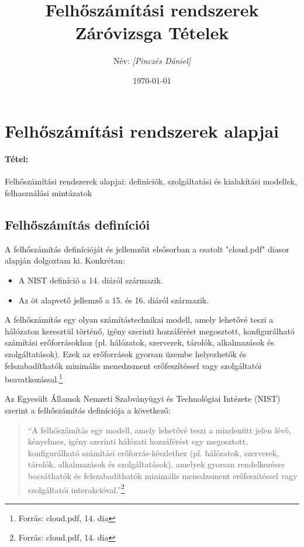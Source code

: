 \documentclass[a4paper,12pt]{article}
\title{\textbf{Felhőszámítási rendszerek Záróvizsga Tételek}}
\author{Név: \textit{[Pinczés Dániel]}}
\date{\today}
\begin{document}
    \maketitle
    \thispagestyle{empty}
    \newpage

    \tableofcontents
    \newpage


    \section{Felhőszámítási rendszerek alapjai}

    \paragraph{Tétel:} Felhőszámítási rendszerek alapjai: definíciók, szolgáltatási és kialakítási modellek, felhasználási mintázatok

    \subsection{Felhőszámítás definíciói}

    A felhőszámítás definícióját és jellemzőit elsősorban a csatolt "cloud.pdf" diasor alapján dolgoztam ki. Konkrétan:

    \begin{itemize}
        \item A NIST definíció a 14. diáról származik.
        \item Az öt alapvető jellemző a 15. és 16. diáról származik.
    \end{itemize}

    A felhőszámítás egy olyan számítástechnikai modell, amely lehetővé teszi a hálózaton keresztül történő, igény szerinti hozzáférést megosztott, konfigurálható számítási erőforrásokhoz (pl. hálózatok, szerverek, tárolók, alkalmazások és szolgáltatások). Ezek az erőforrások gyorsan üzembe helyezhetők és felszabadíthatók minimális menedzsment erőfeszítéssel vagy szolgáltatói beavatkozással.\footnote{Forrás: cloud.pdf, 14. dia}

    Az Egyesült Államok Nemzeti Szabványügyi és Technológiai Intézete (NIST) szerint a felhőszámítás definíciója a következő:

    \begin{quote}
        ``A felhőszámítás egy modell, amely lehetővé teszi a mindenütt jelen lévő, kényelmes, igény szerinti hálózati hozzáférést egy megosztott, konfigurálható számítási erőforrás-készlethez (pl. hálózatok, szerverek, tárolók, alkalmazások és szolgáltatások), amelyek gyorsan rendelkezésre bocsáthatók és felszabadíthatók minimális menedzsment erőfeszítéssel vagy szolgáltatói interakcióval.''\footnote{Forrás: cloud.pdf, 14. dia}
    \end{quote}
\end{document}

